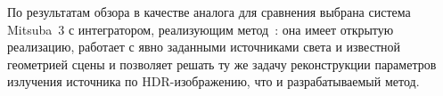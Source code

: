 По результатам обзора в качестве аналога для сравнения выбрана система
Mitsuba~3 с интегратором, реализующим метод~\cite{PRB2021}: она имеет открытую
реализацию, работает с явно заданными источниками света и известной геометрией
сцены и позволяет решать ту же задачу реконструкции параметров излучения
источника по HDR-изображению, что и разрабатываемый метод.


\endinput

